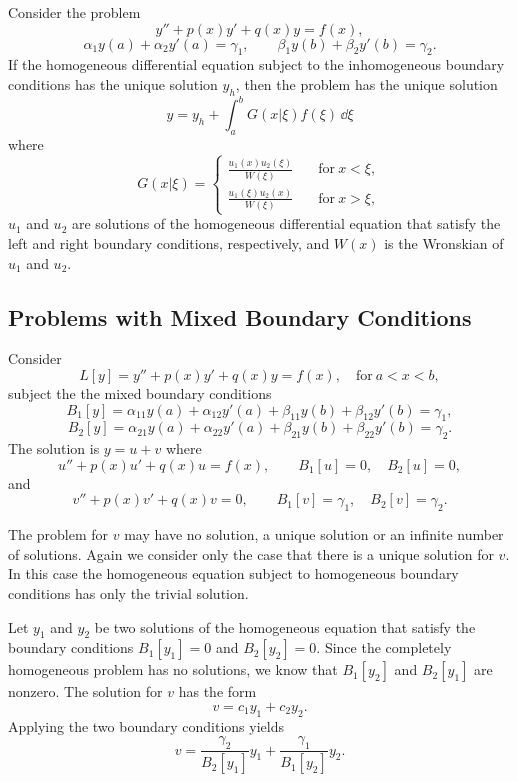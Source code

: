 \begin{Result}
  Consider the problem
  \[
  y'' + p(x) y' + q(x) y = f(x), 
  \]
  \[
  \alpha_1 y(a) + \alpha_2 y'(a) = \gamma_1, \qquad
  \beta_1 y(b) + \beta_2 y'(b) = \gamma_2.
  \]
  If the homogeneous differential equation subject to the inhomogeneous 
  boundary conditions has the unique solution $y_h$, then the problem has 
  the unique solution
  \[
  y = y_h + \int_a^b G(x|\xi) f(\xi) \,\dd \xi
  \]
  where 
  \[
  G(x|\xi) =
  \begin{cases}
    \frac{u_1(x) u_2(\xi)}{W(\xi)} \quad &\mathrm{for}\ x < \xi, \\
    \frac{u_1(\xi) u_2(x)}{W(\xi)} \quad &\mathrm{for}\ x > \xi,
  \end{cases}
  \]
  $u_1$ and $u_2$ are solutions of the homogeneous differential equation that
  satisfy the left and right boundary conditions, respectively, and
  $W(x)$ is the Wronskian of $u_1$ and $u_2$.
\end{Result}











\subsection{Problems with Mixed Boundary Conditions}

Consider 
\[
L[y] = y'' + p(x) y' + q(x) y = f(x), \quad \mathrm{for}\ a < x < b,
\]
subject the the mixed boundary conditions
\[
B_1[y] = \alpha_{11} y(a) + \alpha_{12} y'(a) 
+ \beta_{11} y(b) + \beta_{12} y'(b) = \gamma_1, 
\]
\[
B_2[y] = \alpha_{21} y(a) + \alpha_{22} y'(a) 
+ \beta_{21} y(b) + \beta_{22} y'(b) = \gamma_2. 
\]
The solution is $y = u + v$ where
\[
u'' + p(x) u' + q(x) u = f(x), \qquad B_1[u] = 0, 
\quad B_2[u] = 0,
\]
and
\[
v'' + p(x) v' + q(x) v = 0, \qquad B_1[v] = \gamma_1, 
\quad B_2[v] = \gamma_2.
\]

The problem for $v$ may have no solution, a unique solution or an infinite
number of solutions.  Again we consider only the case that there is a unique 
solution for $v$.  In this case the homogeneous equation subject to homogeneous
boundary conditions has only the trivial solution.

Let $y_1$ and $y_2$ be two solutions of the homogeneous equation that satisfy
the boundary conditions $B_1[y_1] = 0$ and $B_2[y_2] = 0$.  Since the 
completely homogeneous problem has no solutions, we know that 
$B_1[y_2]$ and $B_2[y_1]$ are nonzero.  The solution for $v$ has the form
\[
v = c_1 y_1 + c_2 y_2.
\]
Applying the two boundary conditions yields
\[
v = \frac{\gamma_2}{B_2[y_1]} y_1 + \frac{\gamma_1}{B_1[y_2]} y_2.
\]

